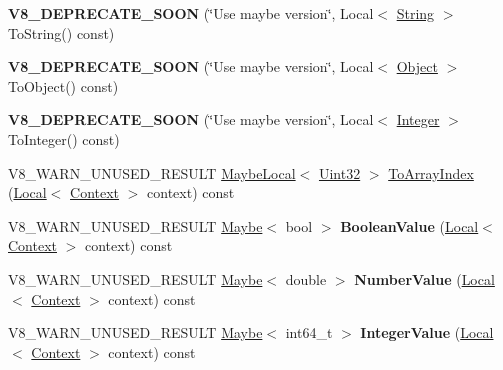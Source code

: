 \begin{DoxyCompactItemize}
\item 
\mbox{\label{classv8_1_1Value_a4d1fe1c6d7ba6cccef24fc3fe528d75a}} 
{\bfseries V8\+\_\+\+D\+E\+P\+R\+E\+C\+A\+T\+E\+\_\+\+S\+O\+ON} (\char`\"{}Use maybe version\char`\"{}, Local$<$ \mbox{\hyperlink{classv8_1_1String}{String}} $>$ To\+String() const)
\item 
\mbox{\label{classv8_1_1Value_a594821f24e204aa6a7b1f003a79089a5}} 
{\bfseries V8\+\_\+\+D\+E\+P\+R\+E\+C\+A\+T\+E\+\_\+\+S\+O\+ON} (\char`\"{}Use maybe version\char`\"{}, Local$<$ \mbox{\hyperlink{classv8_1_1Object}{Object}} $>$ To\+Object() const)
\item 
\mbox{\label{classv8_1_1Value_aaf6d45da85632495545435e44ed2eeab}} 
{\bfseries V8\+\_\+\+D\+E\+P\+R\+E\+C\+A\+T\+E\+\_\+\+S\+O\+ON} (\char`\"{}Use maybe version\char`\"{}, Local$<$ \mbox{\hyperlink{classv8_1_1Integer}{Integer}} $>$ To\+Integer() const)
\item 
V8\+\_\+\+W\+A\+R\+N\+\_\+\+U\+N\+U\+S\+E\+D\+\_\+\+R\+E\+S\+U\+LT \mbox{\hyperlink{classv8_1_1MaybeLocal}{Maybe\+Local}}$<$ \mbox{\hyperlink{classv8_1_1Uint32}{Uint32}} $>$ \mbox{\hyperlink{classv8_1_1Value_a3d7597e5cf475e73f127e2591d46bdf4}{To\+Array\+Index}} (\mbox{\hyperlink{classv8_1_1Local}{Local}}$<$ \mbox{\hyperlink{classv8_1_1Context}{Context}} $>$ context) const
\item 
\mbox{\label{classv8_1_1Value_a80004eea71b861a898b2475a90441751}} 
V8\+\_\+\+W\+A\+R\+N\+\_\+\+U\+N\+U\+S\+E\+D\+\_\+\+R\+E\+S\+U\+LT \mbox{\hyperlink{classv8_1_1Maybe}{Maybe}}$<$ bool $>$ {\bfseries Boolean\+Value} (\mbox{\hyperlink{classv8_1_1Local}{Local}}$<$ \mbox{\hyperlink{classv8_1_1Context}{Context}} $>$ context) const
\item 
\mbox{\label{classv8_1_1Value_ab68edf2318678446ffe2da0f56b6b853}} 
V8\+\_\+\+W\+A\+R\+N\+\_\+\+U\+N\+U\+S\+E\+D\+\_\+\+R\+E\+S\+U\+LT \mbox{\hyperlink{classv8_1_1Maybe}{Maybe}}$<$ double $>$ {\bfseries Number\+Value} (\mbox{\hyperlink{classv8_1_1Local}{Local}}$<$ \mbox{\hyperlink{classv8_1_1Context}{Context}} $>$ context) const
\item 
\mbox{\label{classv8_1_1Value_a939383a1e62d9ae150693147050e712c}} 
V8\+\_\+\+W\+A\+R\+N\+\_\+\+U\+N\+U\+S\+E\+D\+\_\+\+R\+E\+S\+U\+LT \mbox{\hyperlink{classv8_1_1Maybe}{Maybe}}$<$ int64\+\_\+t $>$ {\bfseries Integer\+Value} (\mbox{\hyperlink{classv8_1_1Local}{Local}}$<$ \mbox{\hyperlink{classv8_1_1Context}{Context}} $>$ context) const

\end{DoxyCompactItemize}
